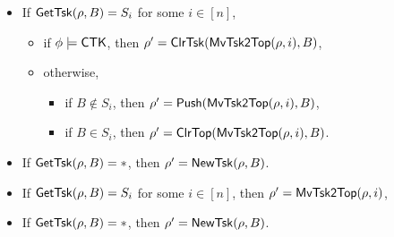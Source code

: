 \noindent {}
\begin{itemize}
	\item If $\mathsf{GetTsk}(\rho, B) = S_i$ for some $i\in[n]$,
	\begin{itemize}
		\item if $\phi \models{\sf CTK}$, then $\rho' = \mathsf{ClrTsk}(\mathsf{MvTsk2Top}(\rho, i), B)$,
		\item otherwise, 
		\begin{itemize}
			\item if $B \notin S_i$, then $\rho' = \mathsf{Push}(\mathsf{MvTsk2Top}(\rho, i), B)$,
			\item if $B \in S_i$, then $\rho' = \mathsf{ClrTop}(\mathsf{MvTsk2Top}(\rho, i), B)$.
		\end{itemize}
	\end{itemize}
	\item If $\mathsf{GetTsk}(\rho, B) = *$, then $\rho' = \mathsf{NewTsk}(\rho, B)$.
\end{itemize}
\noindent {}
\begin{itemize}
	\item If $\mathsf{GetTsk}(\rho, B) = S_i$ for some $i \in [n]$, then $\rho' = \mathsf{MvTsk2Top}(\rho, i)$,
	\item If $\mathsf{GetTsk}(\rho, B) = *$, then $\rho' = \mathsf{NewTsk}(\rho, B)$.
\end{itemize}
